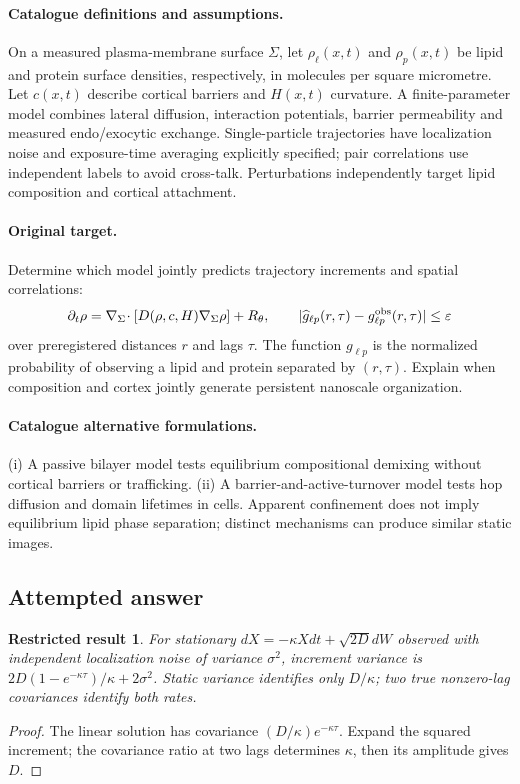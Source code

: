 \documentclass[11pt]{article}
\newtheorem{attemptresult}{Restricted result}[section]
\begin{document}
\paragraph{Catalogue definitions and assumptions.}
On a measured plasma-membrane surface $\Sigma$, let $\rho_\ell(x,t)$ and $\rho_p(x,t)$ be lipid and protein surface densities, respectively, in molecules per square micrometre. Let $c(x,t)$ describe cortical barriers and $H(x,t)$ curvature. A finite-parameter model combines lateral diffusion, interaction potentials, barrier permeability and measured endo/exocytic exchange. Single-particle trajectories have localization noise and exposure-time averaging explicitly specified; pair correlations use independent labels to avoid cross-talk. Perturbations independently target lipid composition and cortical attachment.
\paragraph{Original target.}
Determine which model jointly predicts trajectory increments and spatial correlations:
\[
\partial_t\rho=\nabla_\Sigma\!\cdot[D(\rho,c,H)\nabla_\Sigma\rho]+R_\theta,
\qquad |\widehat g_{\ell p}(r,\tau)-g^{\rm obs}_{\ell p}(r,\tau)|\leq\varepsilon
\]
over preregistered distances $r$ and lags $\tau$. The function $g_{\ell p}$ is the normalized probability of observing a lipid and protein separated by $(r,\tau)$. Explain when composition and cortex jointly generate persistent nanoscale organization.
\paragraph{Catalogue alternative formulations.}
(i) A passive bilayer model tests equilibrium compositional demixing without cortical barriers or trafficking. (ii) A barrier-and-active-turnover model tests hop diffusion and domain lifetimes in cells. Apparent confinement does not imply equilibrium lipid phase separation; distinct mechanisms can produce similar static images.
\subsection{Attempted answer}
\begin{attemptresult}
For stationary $dX=-\kappa Xdt+\sqrt{2D}dW$ observed with independent localization noise of variance $\sigma^2$, increment variance is $2D(1-e^{-\kappa\tau})/\kappa+2\sigma^2$. Static variance identifies only $D/\kappa$; two true nonzero-lag covariances identify both rates.
\end{attemptresult}
\begin{proof}
The linear solution has covariance $(D/\kappa)e^{-\kappa\tau}$. Expand the squared increment; the covariance ratio at two lags determines $\kappa$, then its amplitude gives $D$.
\end{proof}
\end{document}
